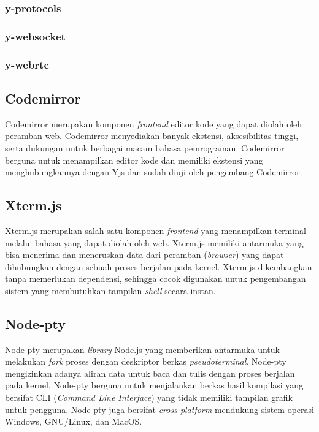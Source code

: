 \subsubsection{y-protocols}

\subsubsection{y-websocket}

\subsubsection{y-webrtc}

\subsection{Codemirror}

Codemirror merupakan komponen \textit{frontend} editor kode yang dapat diolah oleh peramban web. Codemirror menyediakan banyak ekstensi, aksesibilitas tinggi, serta dukungan untuk berbagai macam bahasa pemrograman. Codemirror berguna untuk menampilkan editor kode dan memiliki ekstensi yang menghubungkannya dengan Yjs dan sudah diuji oleh pengembang Codemirror.

\subsection{Xterm.js}

Xterm.js merupakan salah satu komponen \textit{frontend} yang menampilkan terminal melalui bahasa yang dapat diolah oleh web. Xterm.js memiliki antarmuka yang bisa menerima dan meneruskan data dari peramban (\textit{browser}) yang dapat dihubungkan dengan sebuah proses berjalan pada kernel. Xterm.js dikembangkan tanpa memerlukan dependensi, sehingga cocok digunakan untuk pengembangan sistem yang membutuhkan tampilan \textit{shell} secara instan.

\subsection{Node-pty}

Node-pty merupakan \textit{library} Node.js yang memberikan antarmuka untuk melakukan \textit{fork} proses dengan deskriptor berkas \textit{pseudoterminal}. Node-pty mengizinkan adanya aliran data untuk baca dan tulis dengan proses berjalan pada kernel. Node-pty berguna untuk menjalankan berkas hasil kompilasi yang bersifat CLI (\textit{Command Line Interface}) yang tidak memiliki tampilan grafik untuk pengguna. Node-pty juga bersifat \textit{cross-platform} mendukung sistem operasi Windows, GNU/Linux, dan MacOS.


